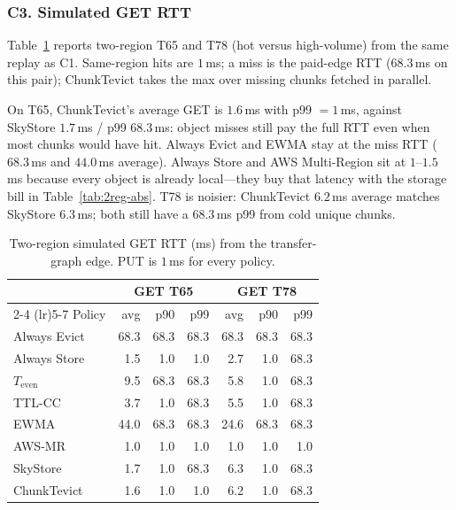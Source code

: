 \subsubsection{C3. Simulated {GET} {RTT}}
\label{sec:eval-lat}

Table~\ref{tab:lat} reports two-region {T}65 and {T}78 (hot versus high-volume) from the same replay as C1.
Same-region hits are $1$\,ms; a miss is the paid-edge {RTT} ($68.3$\,ms on this pair); ChunkTevict takes the max over missing chunks fetched in parallel.

On {T}65, ChunkTevict's average {GET} is $1.6$\,ms with p99 $=1$\,ms, against SkyStore $1.7$\,ms / p99 $68.3$\,ms: object misses still pay the full {RTT} even when most chunks would have hit.
Always Evict and {EWMA} stay at the miss {RTT} ($68.3$\,ms and $44.0$\,ms average).
Always Store and {AWS} Multi-Region sit at $1$--$1.5$\,ms because every object is already local---they buy that latency with the storage bill in Table~\ref{tab:2reg-abs}.
{T}78 is noisier: ChunkTevict $6.2$\,ms average matches SkyStore $6.3$\,ms; both still have a $68.3$\,ms p99 from cold unique chunks.

\begin{table}[t]
\centering
\caption{Two-region simulated {GET} {RTT} (ms) from the transfer-graph edge. {PUT} is $1$\,ms for every policy.}
\label{tab:lat}
\setlength{\tabcolsep}{2.8pt}
{\scriptsize
\begin{tabular}{lrrrrrr}
\toprule
 & \multicolumn{3}{c}{{GET} {T}65} & \multicolumn{3}{c}{{GET} {T}78} \\
\cmidrule(lr){2-4} \cmidrule(lr){5-7}
Policy & avg & p90 & p99 & avg & p90 & p99 \\
\midrule
Always Evict & 68.3 & 68.3 & 68.3 & 68.3 & 68.3 & 68.3 \\
Always Store & 1.5 & 1.0 & 1.0 & 2.7 & 1.0 & 68.3 \\
$T_{\mathrm{even}}$ & 9.5 & 68.3 & 68.3 & 5.8 & 1.0 & 68.3 \\
{TTL}-{CC} & 3.7 & 1.0 & 68.3 & 5.5 & 1.0 & 68.3 \\
{EWMA} & 44.0 & 68.3 & 68.3 & 24.6 & 68.3 & 68.3 \\
{AWS}-{MR} & 1.0 & 1.0 & 1.0 & 1.0 & 1.0 & 1.0 \\
SkyStore & 1.7 & 1.0 & 68.3 & 6.3 & 1.0 & 68.3 \\
ChunkTevict & 1.6 & 1.0 & 1.0 & 6.2 & 1.0 & 68.3 \\
\bottomrule
\end{tabular}}
\end{table}

